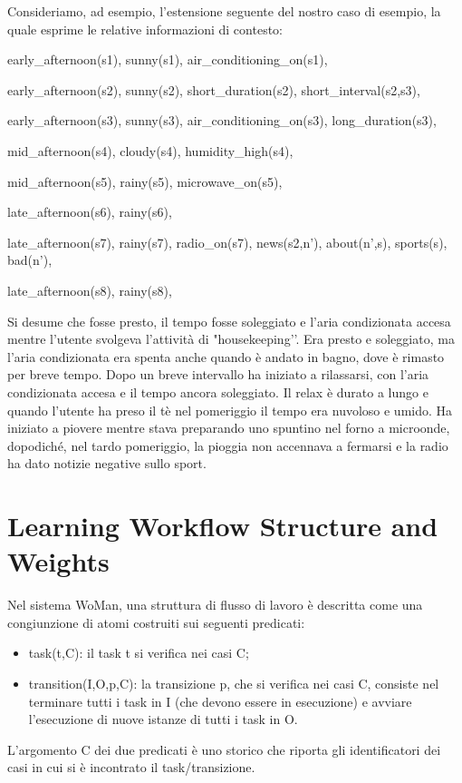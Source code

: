 Consideriamo, ad esempio, l'estensione seguente del nostro caso di esempio, la quale esprime le relative informazioni di contesto:

early\_afternoon(s1), sunny(s1), air\_conditioning\_on(s1),

early\_afternoon(s2), sunny(s2), short\_duration(s2), short\_interval(s2,s3),

early\_afternoon(s3), sunny(s3), air\_conditioning\_on(s3), long\_duration(s3),

mid\_afternoon(s4), cloudy(s4), humidity\_high(s4),

mid\_afternoon(s5), rainy(s5), microwave\_on(s5),

late\_afternoon(s6), rainy(s6),

late\_afternoon(s7), rainy(s7), radio\_on(s7), news(s2,n’), about(n’,s), sports(s), bad(n’),

late\_afternoon(s8), rainy(s8),

Si desume che fosse presto, il tempo fosse soleggiato e l'aria condizionata accesa mentre l'utente svolgeva l'attività di "housekeeping’’. Era presto e soleggiato, ma l'aria condizionata era spenta anche quando è andato in bagno, dove è rimasto per breve tempo. Dopo un breve intervallo ha iniziato a rilassarsi, con l'aria condizionata accesa e il tempo ancora soleggiato. Il relax è durato a lungo e quando l'utente ha preso il tè nel pomeriggio il tempo era nuvoloso e umido. Ha iniziato a piovere mentre stava preparando uno spuntino nel forno a microonde, dopodiché, nel tardo pomeriggio, la pioggia non accennava a fermarsi e la radio ha dato notizie negative sullo sport.
\section{Learning Workflow Structure and Weights}
Nel sistema WoMan, una struttura di flusso di lavoro è descritta come una congiunzione di atomi costruiti sui seguenti predicati:
\begin{itemize}
\item task(t,C): il task t si verifica nei casi C;
\item transition(I,O,p,C): la transizione p, che si verifica nei casi C, consiste nel terminare tutti i task in I (che devono essere in esecuzione) e avviare l'esecuzione di nuove istanze di tutti i task in O.
\end{itemize}

L'argomento C dei due predicati è uno storico che riporta gli identificatori dei casi in cui si è incontrato il task/transizione.

